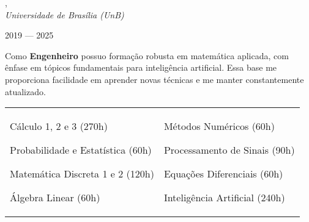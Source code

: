 , \\
\textit{Universidade de Brasília (UnB)}\strut \hfill 2019 --- 2025\\

\vspace*{7pt}

Como \textbf{Engenheiro} possuo formação robusta em matemática aplicada, com ênfase em tópicos fundamentais para inteligência artificial. Essa base me proporciona facilidade em aprender novas técnicas e me manter constantemente atualizado.

\vspace*{7pt}

\begin{tabular}{@{}ll@{}}
  \begin{minipage}[t]{0.45\textwidth}
    \begin{zitemize}
      \item Cálculo 1, 2 e 3 (270h)
      \item Probabilidade e Estatística (60h)
      \item Matemática Discreta 1 e 2 (120h)
      \item Álgebra Linear (60h)
    \end{zitemize}
  \end{minipage}
  &
  \begin{minipage}[t]{0.45\textwidth}
    \begin{zitemize}
      \item Métodos Numéricos (60h)
      \item Processamento de Sinais (90h)
      \item Equações Diferenciais (60h)
      \item Inteligência Artificial (240h)
    \end{zitemize}
  \end{minipage}
\end{tabular}

\vspace*{7pt}
